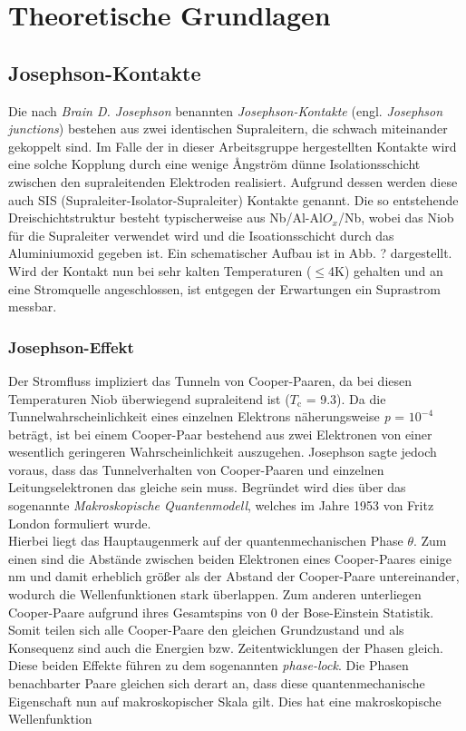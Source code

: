 \chapter{Theoretische Grundlagen}


\section{Josephson-Kontakte}
Die nach \textit{Brain D. Josephson} benannten \textit{Josephson-Kontakte} (engl. \textit{Josephson junctions}) bestehen aus zwei identischen Supraleitern, die schwach miteinander gekoppelt sind. Im Falle der in dieser Arbeitsgruppe hergestellten Kontakte wird eine solche Kopplung durch eine wenige \r{A}ngström dünne Isolationsschicht zwischen den supraleitenden Elektroden realisiert. Aufgrund dessen werden diese auch SIS (Supraleiter-Isolator-Supraleiter) Kontakte genannt. Die so entstehende Dreischichtstruktur besteht typischerweise aus Nb/Al-Al$O_x$/Nb, wobei das Niob für die Supraleiter verwendet wird und die Isoationsschicht durch das Aluminiumoxid gegeben ist. Ein schematischer Aufbau ist in Abb. ? dargestellt. 
Wird der Kontakt nun bei sehr kalten Temperaturen ($\leq$4K) gehalten und an eine Stromquelle angeschlossen, ist entgegen der Erwartungen ein Suprastrom messbar.
        
\subsection{Josephson-Effekt}

Der Stromfluss impliziert das Tunneln von Cooper-Paaren, da bei diesen Temperaturen Niob überwiegend supraleitend ist  (\texttt{${T_\mathrm{c}}$} = 9.3). Da die Tunnelwahrscheinlichkeit eines einzelnen Elektrons näherungsweise \textit{p} = $10^{-4}$ beträgt, ist bei einem Cooper-Paar bestehend aus zwei Elektronen von einer wesentlich geringeren Wahrscheinlichkeit auszugehen. Josephson sagte jedoch voraus, dass das Tunnelverhalten von Cooper-Paaren und einzelnen Leitungselektronen das gleiche sein muss. Begründet wird dies über das sogenannte \textit{Makroskopische Quantenmodell}, welches im Jahre 1953 von Fritz London formuliert wurde. \\
Hierbei liegt das Hauptaugenmerk auf der quantenmechanischen Phase $\theta$. Zum einen sind die Abstände zwischen beiden Elektronen eines Cooper-Paares einige nm und damit erheblich größer als der Abstand der Cooper-Paare untereinander, wodurch die Wellenfunktionen stark überlappen. Zum anderen unterliegen Cooper-Paare aufgrund ihres Gesamtspins von 0 der Bose-Einstein Statistik. Somit teilen sich alle Cooper-Paare den gleichen Grundzustand und als Konsequenz sind auch die Energien bzw. Zeitentwicklungen der Phasen gleich. Diese beiden Effekte führen zu dem sogenannten \textit{phase-lock}. Die Phasen benachbarter Paare gleichen sich derart an, dass diese quantenmechanische Eigenschaft nun auf makroskopischer Skala gilt. Dies hat eine makroskopische Wellenfunktion 

